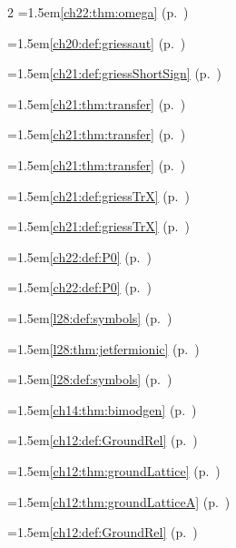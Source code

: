 \begin{multicols}{2}
\hangindent=1.5em\quad \ref{ch22:thm:omega} (p.~\pageref{ch22:thm:omega})\par
\hangindent=1.5em\quad \ref{ch20:def:griessaut} (p.~\pageref{ch20:def:griessaut})\par
\hangindent=1.5em\quad \ref{ch21:def:griessShortSign} (p.~\pageref{ch21:def:griessShortSign})\par
\hangindent=1.5em\quad \ref{ch21:thm:transfer} (p.~\pageref{ch21:thm:transfer})\par
\hangindent=1.5em\quad \ref{ch21:thm:transfer} (p.~\pageref{ch21:thm:transfer})\par
\hangindent=1.5em\quad \ref{ch21:thm:transfer} (p.~\pageref{ch21:thm:transfer})\par
\hangindent=1.5em\quad \ref{ch21:def:griessTrX} (p.~\pageref{ch21:def:griessTrX})\par
\hangindent=1.5em\quad \ref{ch21:def:griessTrX} (p.~\pageref{ch21:def:griessTrX})\par
\hangindent=1.5em\quad \ref{ch22:def:P0} (p.~\pageref{ch22:def:P0})\par
\hangindent=1.5em\quad \ref{ch22:def:P0} (p.~\pageref{ch22:def:P0})\par
\hangindent=1.5em\quad \ref{l28:def:symbols} (p.~\pageref{l28:def:symbols})\par
\hangindent=1.5em\quad \ref{l28:thm:jetfermionic} (p.~\pageref{l28:thm:jetfermionic})\par
\hangindent=1.5em\quad \ref{l28:def:symbols} (p.~\pageref{l28:def:symbols})\par
\hangindent=1.5em\quad \ref{ch14:thm:bimodgen} (p.~\pageref{ch14:thm:bimodgen})\par
\hangindent=1.5em\quad \ref{ch12:def:GroundRel} (p.~\pageref{ch12:def:GroundRel})\par
\hangindent=1.5em\quad \ref{ch12:thm:groundLattice} (p.~\pageref{ch12:thm:groundLattice})\par
\hangindent=1.5em\quad \ref{ch12:thm:groundLatticeA} (p.~\pageref{ch12:thm:groundLatticeA})\par
\hangindent=1.5em\quad \ref{ch12:def:GroundRel} (p.~\pageref{ch12:def:GroundRel})\par

\end{multicols}
